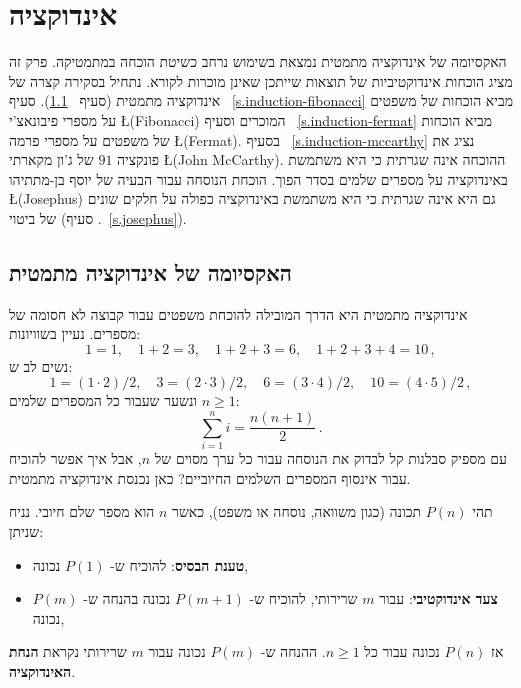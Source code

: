 

\chapter{אינדוקציה}\label{c.induction}


האקסיומה של אינדוקציה מתמטית נמצאת בשימוש נרחב כשיטת הוכחה במתמטיקה. פרק זה מציג הוכחות אינדוקטיביות של תוצאות שייתכן שאינן מוכרות לקורא. נתחיל בסקירה קצרה של אינדוקציה מתמטית (סעיף%
~\ref{s.induction-axiom}).
סעיף%
~\ref{s.induction-fibonacci}
מביא הוכחות של משפטים על מספרי פיבונאצ'י
\L{(Fibonacci)}
המוכרים וסעיף%
~\ref{s.induction-fermat}
מביא הוכחות של משפטים על מספרי פרמה
\L{(Fermat)}.
בסעיף%
~\ref{s.induction-mccarthy}
נציג את פונקציה
$91$
של ג'ון מקארתי
\L{(John McCarthy)}.
ההוכחה אינה שגרתית כי היא משתמשת באינדוקציה על מספרים שלמים בסדר הפוך. הוכחת הנוסחה עבור הבעיה של יוסף בן-מתתיהו
\L{(Josephus)}
גם היא אינה שגרתית כי היא משתמשת באינדוקציה כפולה על חלקים שונים של ביטוי (סעיף%
.~\ref{s.josephus}).

\section{האקסיומה של אינדוקציה מתמטית}\label{s.induction-axiom}

אינדוקציה מתמטית היא הדרך המובילה להוכחת משפטים עבור קבוצה לא חסומה של מספרים. נעיין בשוויונות:
\[
1=1,\quad 1+2=3,\quad 1+2+3=6,\quad 1+2+3+4=10\,,
\]
נשים לב ש:
\[
1=(1\cdot 2)/2,\quad 3=(2\cdot 3)/2,\quad  6=(3\cdot 4)/2,\quad 10=(4\cdot 5)/2\,,
\]
ונשער שעבור כל המספרים שלמים
$n\geq 1$:
\[
\sum_{i=1}^n i = \frac{n(n+1)}{2}\,.
\]
עם מספיק סבלנות קל לבדוק את הנוסחה עבור כל ערך מסוים של
$n$,
אבל איך אפשר להוכיח עבור אינסוף המספרים השלמים החיוביים? כאן נכנסת אינדוקציה מתמטית.

\begin{axiom}
תהי
$P(n)$
תכונה (כגון משוואה, נוסחה או משפט), כאשר 
$n$
הוא מספר שלם חיובי. נניח שניתן:
\begin{itemize}
\item \textbf{טענת הבסיס}: 
להוכיח ש-%
$P(1)$
נכונה,
\item \textbf{צעד אינדוקטיבי}:
עבור 
$m$
שרירותי, להוכיח ש-%
$P(m+1)$
נכונה בהנחה ש-%
$P(m)$
נכונה,
\end{itemize}
אז
$P(n)$
נכונה עבור כל
$n\geq 1$.
ההנחה ש-%
$P(m)$
נכונה עבור 
$m$ 
שרירותי נקראת
\textbf{הנחת האינדוקציה}.
\end{axiom}

